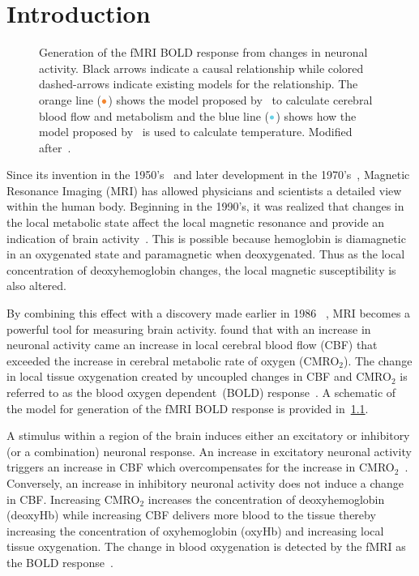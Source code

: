 \chapter{Introduction}
\label{ch:introduction}
\begin{figure}[tb]
  \centering
  \vspace{10pt}
  
  \caption[Generation of the fMRI BOLD response and a corresponding temperature change]{\label{fig:flowchart} Generation of the fMRI BOLD response from changes in neuronal activity.  Black arrows indicate a causal relationship while colored dashed-arrows indicate existing models for the relationship.  The orange line ($\color{goldfish}\bullet$) shows the model proposed by~\citet{sotero2011} to calculate cerebral blood flow and metabolism and the blue line ($\color{aoi}\bullet$) shows how the model proposed by~\citet{collins} is used to calculate temperature.  Modified after~\citet{sotero2007}.}
\end{figure}

Since its invention in the 1950's~\citep{carr1954} and later development in the 1970's~\citep{lauterbur1973}, {M}agnetic {R}esonance {I}maging ({MRI}) has allowed physicians and scientists a detailed view within the human body.  Beginning in the 1990's, it was realized that changes in the local metabolic state affect the local magnetic resonance and provide an indication of brain activity~\citep{ogawa1990,kwong1992}.  This is possible because hemoglobin is diamagnetic in an oxygenated state and paramagnetic when deoxygenated.  Thus as the local concentration of deoxyhemoglobin changes, the local magnetic susceptibility is also altered.  

By combining this effect with a discovery made earlier in 1986 ~\citep{fox1986}, MRI becomes a powerful tool for measuring brain activity.   found that with an increase in neuronal activity came an increase in local cerebral blood flow (CBF) that exceeded the increase in cerebral metabolic rate of oxygen (CMRO$_2$).  The change in local tissue oxygenation created by uncoupled changes in CBF and CMRO$_2$ is referred to as the blood oxygen dependent~(BOLD) response~\citep{kwong1992}.  A schematic of the model for generation of the fMRI BOLD response is provided in~\cref{fig:flowchart}.

A stimulus within a region of the brain induces either an excitatory or inhibitory (or a combination) neuronal response.  An increase in excitatory neuronal activity triggers an increase in CBF which overcompensates for the increase in CMRO$_2$~\citep{fox1986}.  Conversely, an increase in inhibitory neuronal activity does not induce a change in CBF.  Increasing CMRO$_2$ increases the concentration of deoxyhemoglobin (deoxyHb) while increasing CBF delivers more blood to the tissue thereby increasing the concentration of oxyhemoglobin (oxyHb) and increasing local tissue oxygenation.  The change in blood oxygenation is detected by the fMRI as the BOLD response~\citep{kwong1992}.

